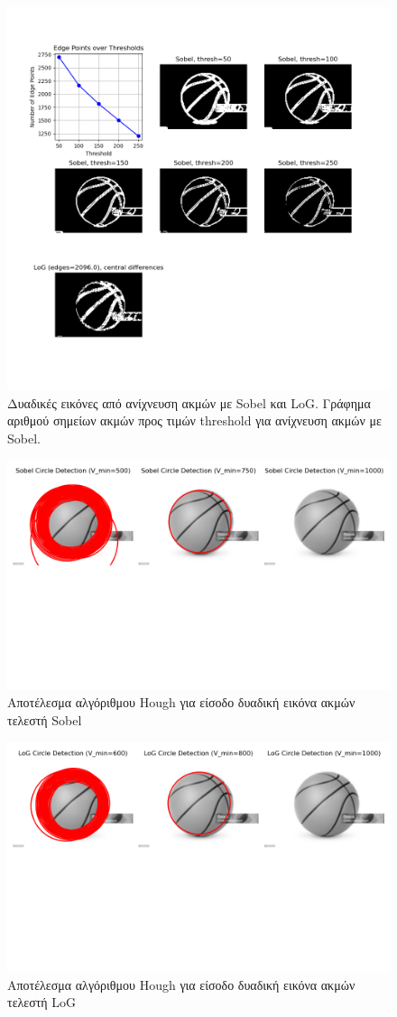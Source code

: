 \documentclass{article}
\begin{document}
\begin{figure}
    \includegraphics[width=\textwidth]{log_n_sobel.png}
    \caption{Δυαδικές εικόνες από ανίχνευση ακμών με Sobel και LoG. Γράφημα αριθμού
    σημείων ακμών προς τιμών threshold για ανίχνευση ακμών με Sobel.}\label{lognsobel}
\end{figure}

\begin{figure}
    \includegraphics[width=\textwidth]{sobel_circle.png}
    \caption{Αποτέλεσμα αλγόριθμου Hough για είσοδο δυαδική εικόνα ακμών τελεστή Sobel}\label{sobel_hough}
\end{figure}

\begin{figure}
    \includegraphics[width=\textwidth]{log_circle.png}
    \caption{Αποτέλεσμα αλγόριθμου Hough για είσοδο δυαδική εικόνα ακμών τελεστή LoG}\label{sobel_hough}
\end{figure}
\end{document}
